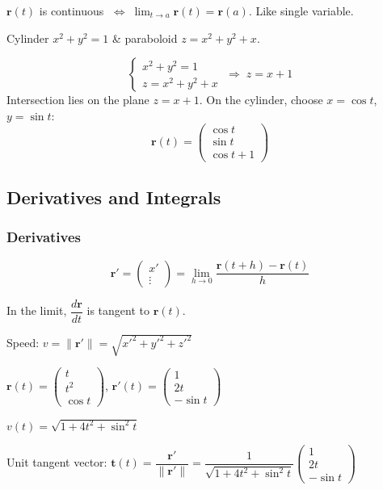 $\mathbf{r}(t)$ is continuous $\;\Longleftrightarrow\;
  \displaystyle\lim_{t\to a}\mathbf{r}(t) = \mathbf{r}(a)$. \;
Like single variable.

\begin{example}
  Cylinder $x^{2}+y^{2}=1$ \;\&\; paraboloid $z = x^{2}+y^{2}+x$.

  \[
    \begin{cases}
      x^{2}+y^{2}=1 \\ z=x^{2}+y^{2}+x
    \end{cases}
    \;\Longrightarrow\; z = x+1
  \]
  Intersection lies on the plane $z=x+1$.
  On the cylinder, choose $x=\cos t$, $y=\sin t$:
  \[
    \mathbf{r}(t)
    =
    \begin{pmatrix}
      \cos t \\ \sin t \\ \cos t + 1
    \end{pmatrix}
  \]
\end{example}

\subsection{Derivatives and Integrals}

\subsubsection{Derivatives}

\[
  \mathbf{r}'
  =
  \begin{pmatrix}
    x' \\[4pt] \vdots
  \end{pmatrix}
  = \lim_{h\to 0}\frac{\mathbf{r}(t+h)-\mathbf{r}(t)}{h}
\]

In the limit, $\dfrac{d\mathbf{r}}{dt}$ is tangent to $\mathbf{r}(t)$.

Speed: $v = \lVert\mathbf{r}'\rVert = \sqrt{x'^{2}+y'^{2}+z'^{2}}$

\begin{example}
  $\mathbf{r}(t) =
    \begin{pmatrix}
      t \\ t^{2} \\ \cos t
    \end{pmatrix}
  $, \quad
  $\mathbf{r}'(t) =
    \begin{pmatrix}
      1 \\ 2t \\ -\sin t
    \end{pmatrix}
  $

  $v(t) = \sqrt{1+4t^{2}+\sin^{2}t}$

  Unit tangent vector:
  $\mathbf{t}(t) = \dfrac{\mathbf{r}'}{\lVert\mathbf{r}'\rVert}
    = \dfrac{1}{\sqrt{1+4t^{2}+\sin^{2}t}}
    \begin{pmatrix}
      1 \\ 2t \\ -\sin t
    \end{pmatrix}
  $
\end{example}


